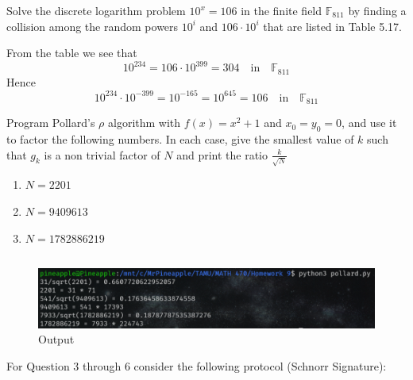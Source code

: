 \documentclass[12pt]{article}
\begin{document}
\thispagestyle{empty}

\problem Solve the discrete logarithm problem $10^x=106$ in the finite field $\mathbb{F}_{811}$ by finding a collision among the random powers $10^i$ and $106\cdot10^i$ that are listed in Table 5.17.

\solution
From the table we see that
\[10^{234}=106\cdot10^{399}=304\quad\text{in}\quad\mathbb{F}_{811}\]
Hence
\[10^{234}\cdot10^{-399}=10^{-165}=10^{645}=106\quad\text{in}\quad\mathbb{F}_{811}\]

\newpage
\problem Program Pollard's $\rho$ algorithm with $f(x)=x^2+1$ and $x_0=y_0=0$, and use it to factor the following numbers. In each case, give the smallest value of $k$ such that $g_k$ is a non trivial factor of $N$ and print the ratio $\frac{k}{\sqrt{N}}$
\begin{enumerate}
    \item $N=2201$
    \item $N=9409613$
    \item $N=1782886219$
\end{enumerate}

\solution
\inputminted{py}{pollard.py}

\begin{figure}[!ht]
    \centering
    \includegraphics[width=\textwidth]{Question 2.png}
    \caption{Output}
\end{figure}

\newpage
\noindent
For Question 3 through 6 consider the following protocol (Schnorr Signature):
\end{document}

